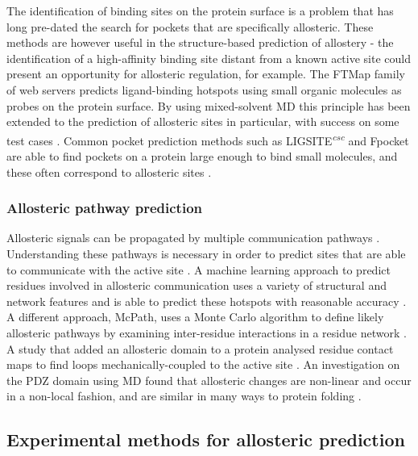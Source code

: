 The identification of binding sites on the protein surface is a problem that has long pre-dated the search for pockets that are specifically allosteric.
These methods are however useful in the structure-based prediction of allostery - the identification of a high-affinity binding site distant from a known active site could present an opportunity for allosteric regulation, for example.
The FTMap family of web servers \cite{Kozakov2015} predicts ligand-binding hotspots using small organic molecules as probes on the protein surface.
By using mixed-solvent MD this principle has been extended to the prediction of allosteric sites in particular, with success on some test cases \cite{Ghanakota2016}.
Common pocket prediction methods such as LIGSITE\textsuperscript{\it csc} \cite{Huang2006} and Fpocket \cite{LeGuilloux2009} are able to find pockets on a protein large enough to bind small molecules, and these often correspond to allosteric sites \cite{Greener2017}.


\subsubsection{Allosteric pathway prediction}

Allosteric signals can be propagated by multiple communication pathways \cite{DelSol2009}.
Understanding these pathways is necessary in order to predict sites that are able to communicate with the active site \cite{Dokholyan2016}.
A machine learning approach to predict residues involved in allosteric communication uses a variety of structural and network features and is able to predict these hotspots with reasonable accuracy \cite{Demerdash2009}.
A different approach, McPath, uses a Monte Carlo algorithm to define likely allosteric pathways by examining inter-residue interactions in a residue network \cite{Kaya2013}.
A study that added an allosteric domain to a protein analysed residue contact maps to find loops mechanically-coupled to the active site \cite{Dagliyan2016}.
An investigation on the PDZ domain using MD found that allosteric changes are non-linear and occur in a non-local fashion, and are similar in many ways to protein folding \cite{Buchenberg2017}.


\subsection{Experimental methods for allosteric prediction}

